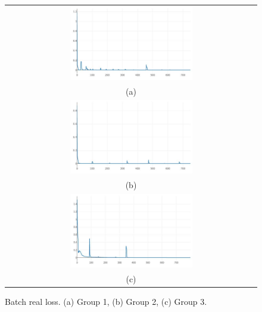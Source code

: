 \documentclass[10pt,twocolumn,letterpaper]{article}
\begin{document}
\begin{figure}%
\centering\begin{tabular}{c}
\includegraphics[width=0.5\textwidth]{fig11-a}\\
(a)\\[3ex]%
\includegraphics[width=0.5\textwidth]{fig11-b}\\
(b)\\[3ex]
\includegraphics[width=0.5\textwidth]{fig11-c}\\
(c)
\end{tabular}
\caption{Batch real loss. (a) Group 1, (b) Group 2, (c) Group 3.}%
\label{fig11}%
\end{figure}
\end{document}
